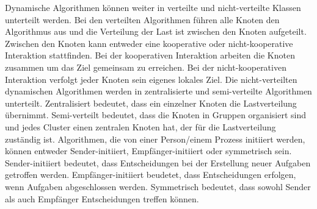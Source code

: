 \documentclass[a4paper,12pt]{article}
\begin{document}
Dynamische Algorithmen können weiter in verteilte und nicht-verteilte Klassen unterteilt werden. Bei den verteilten Algorithmen führen alle Knoten den Algorithmus aus und die Verteilung der Last ist zwischen den Knoten aufgeteilt. Zwischen den Knoten kann entweder eine kooperative oder nicht-kooperative Interaktion stattfinden. Bei der kooperativen Interaktion arbeiten die Knoten zusammen um das Ziel gemeinsam zu erreichen. Bei der nicht-kooperativen Interaktion verfolgt jeder Knoten sein eigenes lokales Ziel. Die nicht-verteilten dynamischen Algorithmen werden in zentralisierte und semi-verteilte Algorithmen unterteilt. Zentralisiert bedeutet, dass ein einzelner Knoten die Lastverteilung übernimmt. Semi-verteilt bedeutet, dass die Knoten in Gruppen organisiert sind und jedes Cluster einen zentralen Knoten hat, der für die Lastverteilung zuständig ist. 
\newline
Algorithmen, die von einer Person/einem Prozess initiiert werden, können entweder Sender-initiiert, Empfänger-initiiert oder symmetrisch sein.
Sender-initiiert bedeutet, dass Entscheidungen bei der Erstellung neuer Aufgaben getroffen werden. Empfänger-initiiert beudetet, dass Entscheidungen erfolgen, wenn Aufgaben abgeschlossen werden. Symmetrisch bedeutet, dass sowohl Sender als auch Empfänger Entscheidungen treffen können. \cite[S. 3]{LoadBalancing}
\end{document}
